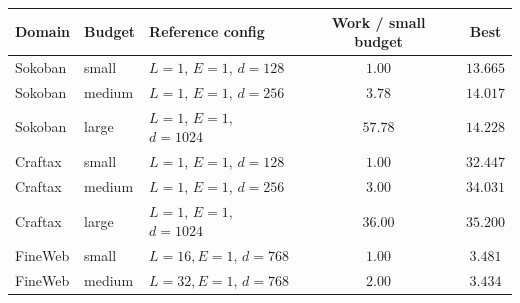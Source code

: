\documentclass[10pt]{article}
\begin{document}
\setcounter{table}{1}
\begin{center}
\small
\setlength{\tabcolsep}{3.8pt}
\begin{tabular}{@{}lllcc@{}}
  \toprule
  Domain & Budget & Reference config & Work / small budget & Best \\
  \midrule
  Sokoban & small & \(L=1\), \(E=1\), \(d=128\) & \(1.00\) & \(13.665\) \\
  Sokoban & medium & \(L=1\), \(E=1\), \(d=256\) & \(3.78\) & \(14.017\) \\
  Sokoban & large & \(L=1\), \(E=1\), \(d=1024\) & \(57.78\) & \(14.228\) \\
  Craftax & small & \(L=1\), \(E=1\), \(d=128\) & \(1.00\) & \(32.447\) \\
  Craftax & medium & \(L=1\), \(E=1\), \(d=256\) & \(3.00\) & \(34.031\) \\
  Craftax & large & \(L=1\), \(E=1\), \(d=1024\) & \(36.00\) & \(35.200\) \\
  FineWeb & small & \(L=16, E=1\), \(d=768\) & \(1.00\) & \(3.481\) \\
  FineWeb & medium & \(L=32, E=1\), \(d=768\) & \(2.00\) & \(3.434\) \\
  \bottomrule
\end{tabular}
\end{center}
\clearpage
\end{document}
